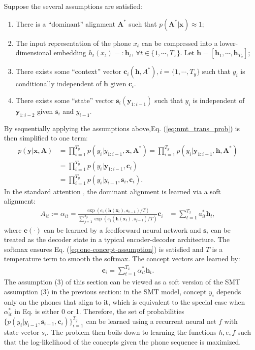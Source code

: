\documentclass[journal]{IEEEtran}
\begin{document}
Suppose the several assumptions are satisfied:
\begin{enumerate}
    \item There is a ``dominant'' alignment $\mathbf A^*$ such that $p(\mathbf A^*|\mathbf x) \approx 1$;
    \item The input representation of the phone $x_t$ can be compressed into a lower-dimensional embedding $h_t(x_t) =: \mathbf h_t$, $\forall t \in \{1, \cdots, T_x\}$. Let $\mathbf h = [\mathbf h_1, \cdots, \mathbf h_{T_x}]$;
    \item There exists some ``context'' vector $\mathbf c_i(\mathbf h, A^*), i=\{1, \cdots, T_y\}$ such that $y_i$ is conditionally independent of $\mathbf h$ given $\mathbf c_i$.
    \item There exists some ``state'' vector $\mathbf s_i(\mathbf y_{1:i-1})$ such that $y_i$ is independent of $\mathbf y_{1:i-2}$ given $\mathbf s_i$ and $y_{i-1}$.
\end{enumerate}

By sequentially applying the assumptions above,Eq. (\ref{eq:nmt_trans_prob}) is then simplified to one term:
\begin{align}\label{eq:nmt_trans_prob_simplify}
    p(\mathbf y|\mathbf x, \mathbf A)&= \prod_{i=1}^{T_y} p(y_i|y_{1:i-1}, \mathbf{x}, \mathbf{A}^*) = \prod_{i=1}^{T_y} p(y_i|\mathbf y_{1:i-1}, \mathbf h, \mathbf{A}^*)\\
    &= \prod_{i=1}^{T_y} p(y_i|\mathbf y_{1:i-1}, \mathbf c_i)\\
    &= \prod_{i=1}^{T_y} p(y_i|y_{i-1}, \mathbf s_i, \mathbf c_i).
\end{align}
In the standard attention \cite{Bahdanau14}, the dominant alignment is learned via a soft alignment:
\begin{align}\label{eq:def_soft_align}
    A_{it}:= \alpha_{it} = \frac{\exp(e_i(\mathbf h(\mathbf x_t), \mathbf s_{i-1})/T)}{\sum_{j=1}^{T_y} \exp(e_j(\mathbf h(\mathbf{x}_t), \mathbf s_{j-1})/T)}
    \mathbf{c}_i &= \sum_{t=1}^{T_x} a^*_{it} \mathbf{h}_{t},
\end{align}
where $\mathbf e(\cdot)$ can be learned by a feedforward neural network and $\mathbf s_i$ can be treated as the decoder state in a typical encoder-decoder architecture. The softmax ensures Eq. (\ref{eq:one-concept-assumption}) is satisfied and $T$ is a temperature term to smooth the softmax. The concept vectors are learned by:
\begin{align}\label{eq:def_context_vec}
    \mathbf c_i = \sum_{t=1}^{T_x} \alpha_{it}^* \mathbf h_t.
\end{align}
The assumption (3) of this section can be viewed as a soft version of the SMT assumption (3) in the previous section:  in the SMT model, concept $y_i$ depends only on the phones that align to it, which is equivalent to the special case when $\alpha_{it}^*$ in Eq.\label{eq:def_context_vec} is either 0 or 1. Therefore, the set of probabilities $\{p(y_i|y_{i-1}, \mathbf s_{i-1}, \mathbf c_i)\}_{i=1}^{T_y}$ can be learned using a recurrent neural net $f$ with state vector $s_i$. The problem then boils down to learning the functions $h, e, f$ such that the log-likelihood of the concepts given the phone sequence is maximized.
\end{document}
